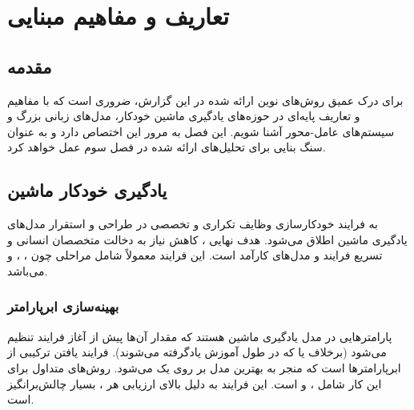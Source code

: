 
\chapter{تعاریف و مفاهیم مبنایی }
\thispagestyle{empty}
\section{مقدمه}
برای درک عمیق روش‌های نوین ارائه شده در این گزارش، ضروری است که با مفاهیم و تعاریف پایه‌ای در حوزه‌های یادگیری ماشین خودکار، مدل‌های زبانی بزرگ و سیستم‌های عامل-محور آشنا شویم. این فصل به مرور این  اختصاص دارد و به عنوان سنگ بنایی برای تحلیل‌های ارائه شده در فصل سوم عمل خواهد کرد.

\section{یادگیری خودکار ماشین}
 به فرایند خودکارسازی وظایف تکراری و تخصصی در طراحی و استقرار مدل‌های یادگیری ماشین اطلاق می‌شود. هدف نهایی ، کاهش نیاز به دخالت متخصصان انسانی و تسریع فرایند  و  مدل‌های کارآمد است. این فرایند معمولاً شامل مراحلی چون ، ،  و  می‌باشد.

\subsection{بهینه‌سازی ابرپارامتر}
 پارامترهایی در مدل یادگیری ماشین هستند که مقدار آن‌ها پیش از آغاز فرایند  تنظیم می‌شود (برخلاف  یا  که در طول آموزش یادگرفته می‌شوند).  فرایند یافتن ترکیبی از ابرپارامترها است که منجر به بهترین  مدل بر روی یک  می‌شود. روش‌های متداول برای این کار شامل ،  و  است. این فرایند به دلیل  بالای ارزیابی هر ، بسیار چالش‌برانگیز است.

